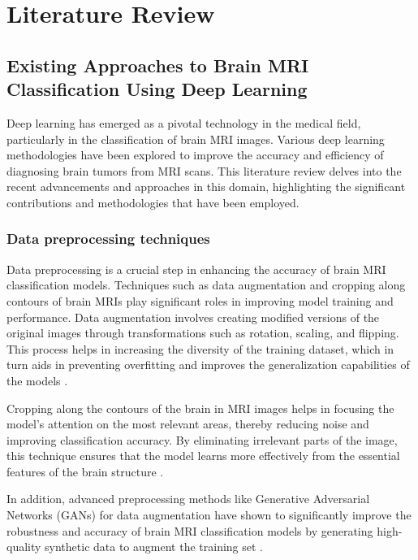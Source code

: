 \section{Literature Review}\label{s:lit_review}


\subsection{Existing Approaches to Brain MRI Classification Using Deep Learning}

Deep learning has emerged as a pivotal technology in the medical field, particularly in the classification of brain MRI images. Various deep learning methodologies have been explored to improve the accuracy and efficiency of diagnosing brain tumors from MRI scans. This literature review delves into the recent advancements and approaches in this domain, highlighting the significant contributions and methodologies that have been employed.

\subsubsection{Data preprocessing techniques}

Data preprocessing is a crucial step in enhancing the accuracy of brain MRI classification models. Techniques such as data augmentation \cite{10183465} and cropping along contours of brain MRIs play significant roles in improving model training and performance. Data augmentation involves creating modified versions of the original images through transformations such as rotation, scaling, and flipping. This process helps in increasing the diversity of the training dataset, which in turn aids in preventing overfitting and improves the generalization capabilities of the models \cite{Paul2017Deep}.

Cropping along the contours of the brain in MRI images helps in focusing the model’s attention on the most relevant areas, thereby reducing noise and improving classification accuracy. By eliminating irrelevant parts of the image, this technique ensures that the model learns more effectively from the essential features of the brain structure \cite{Asif2022Improving}.

In addition, advanced preprocessing methods like Generative Adversarial Networks (GANs) for data augmentation have shown to significantly improve the robustness and accuracy of brain MRI classification models by generating high-quality synthetic data to augment the training set \cite{Fahimi2020Generative}.

